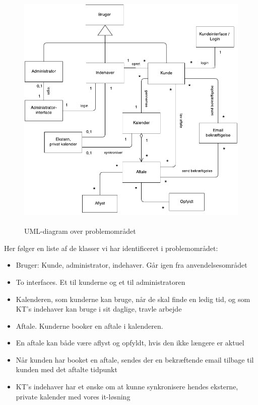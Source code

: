 \documentclass[12pt]{article}   %
\begin{document}
\begin{figure}[!ht]
\includegraphics[width=12cm, height=12cm]{problemomr.pdf}
\caption{UML-diagram over problemområdet}
\label{fig:problem}
\end{figure}

Her følger en liste af de klasser vi har identificeret i problemområdet:

\begin{itemize}
\item Bruger: Kunde, administrator, indehaver. Går igen fra
	anvendelsesområdet
\item To interfaces. Et til kunderne og et til administratoren
\item Kalenderen, som kunderne kan bruge, når de skal finde en ledig tid, og
	som KT's indehaver kan bruge i sit daglige, travle arbejde
\item Aftale. Kunderne booker en aftale i kalenderen.
\item En aftale kan både være aflyst og opfyldt, hvis den ikke længere er
	aktuel
\item Når kunden har booket en aftale, sendes der en bekræftende email tilbage
	til kunden med det aftalte tidpunkt
\item KT's indehaver har et ønske om at kunne synkronisere hendes eksterne,
	private kalender med vores it-løsning
\end{itemize}
\end{document}
